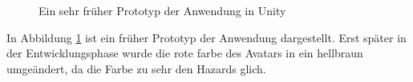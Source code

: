 \begin{figure}[h]
  \caption[Altes Setup der Anwendung]{Ein sehr früher Prototyp der Anwendung in Unity}
  \label{fig:oldSetup}
\end{figure}

In Abbildung \ref{fig:oldSetup} ist ein früher Prototyp der Anwendung dargestellt. Erst später in der Entwicklungsphase wurde die rote farbe des Avatars in ein hellbraun umgeändert, da die Farbe zu sehr den Hazards glich.

